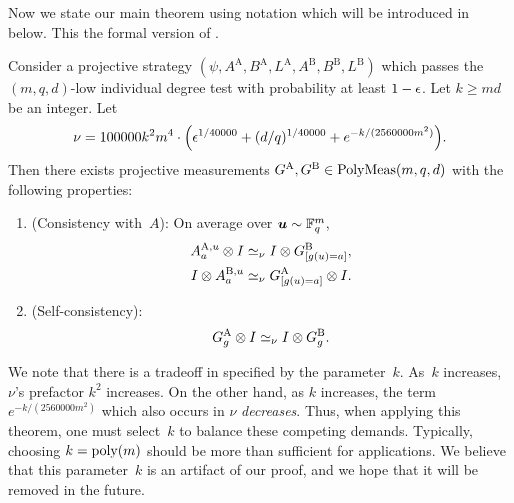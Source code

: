 Now we state our main theorem using notation which will be introduced in  below.
This the formal version of .

\begin{theorem}\label{thm:main-formal}
  Consider a projective strategy $(\psi, A^{\mathrm{A}},B^{\mathrm{A}},L^{\mathrm{A}},A^{\mathrm{B}},B^{\mathrm{B}},L^{\mathrm{B}})$ 
   which passes the  $(m,q,d)$-low individual degree test with probability at least $1-\epsilon$.
  Let $k \geq md$ be an integer.
  Let
  \begin{equation*}
  \nu = 100000 k^2m^4 \cdot \Big(\epsilon^{1/40000} + (d/q)^{1/40000} + e^{-k/(2560000m^2)}\Big).
  \end{equation*}
Then there exists projective measurements $G^{\mathrm{A}}, G^{\mathrm{B}} \in \mathrm{PolyMeas}(m, q, d)$ with the following properties:
\begin{enumerate}
  \item (Consistency with~$A$):  On average over $\boldsymbol{u} \sim \mathbb F_q^{m}$,
	  \begin{align*}
	  A^{\mathrm{A},u}_a \otimes I
	  	&\simeq_{\nu} I \otimes G^{\mathrm{B}}_{[g(u)=a]},\\
	I \otimes A^{\mathrm{B},u}_a
	  	&\simeq_{\nu}  G^{\mathrm{A}}_{[g(u)=a]} \otimes I.
	  \end{align*}
\item (Self-consistency):
	\begin{equation*}
	G^{\mathrm{A}}_g \otimes I \simeq_{\nu} I \otimes G^{\mathrm{B}}_g.
	\end{equation*}
\end{enumerate}
\end{theorem}

We note that there is a tradeoff in  specified by the parameter~$k$.
As~$k$ increases, $\nu$'s prefactor $k^2$ increases.
On the other hand, as $k$ increases, the term $e^{- k/(2560000m^2)}$ which also occurs in $\nu$ \emph{decreases}.
Thus, when applying this theorem, one must select~$k$ to balance these competing demands.
Typically, choosing $k = \mathrm{poly}(m)$ should be more than sufficient for applications.
We believe that this parameter~$k$ is an artifact of our proof,
and we hope that it will be removed in the future.

